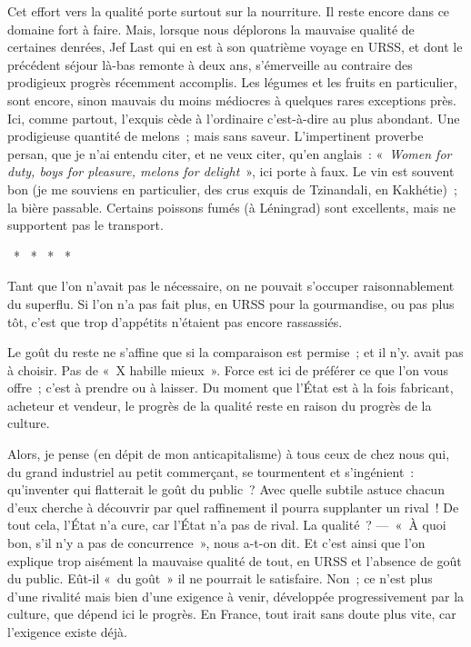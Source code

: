 \documentclass[french,twoside]{book} %
\begin{document}
Cet effort vers la qualité porte surtout sur la nourriture. Il reste encore dans ce domaine fort à faire. Mais, lorsque nous déplorons la mauvaise qualité de certaines denrées, Jef Last qui en est à son quatrième voyage en URSS, et dont le précédent séjour là-bas remonte à deux ans, s’émerveille au contraire des prodigieux progrès récemment accomplis. Les légumes et les fruits en particulier, sont encore, sinon mauvais du moins médiocres à quelques rares exceptions près. Ici, comme partout, l’exquis cède à l’ordinaire c’est-à-dire au plus abondant. Une prodigieuse quantité de melons ; mais sans saveur. L’impertinent proverbe persan, que je n’ai entendu citer, et ne veux citer, qu’en anglais : « \emph{Women for duty, boys for pleasure, melons for delight} », ici porte à faux. Le vin est souvent bon (je me souviens en particulier, des crus exquis de Tzinandali, en Kakhétie) ; la bière passable. Certains poissons fumés (à Léningrad) sont excellents, mais ne supportent pas le transport.\par
{\centering \noindent *  *  *  *  *\par}
\noindent Tant que l’on n’avait pas le nécessaire, on ne pouvait s’occuper raisonnablement du superflu. Si l’on n’a pas fait plus, en URSS pour la gourmandise, ou pas plus tôt, c’est que trop d’appétits n’étaient pas encore rassassiés.\par
Le goût du reste ne s’affine que si la comparaison est permise ; et il n’y. avait pas à choisir. Pas de « X habille mieux ». Force est ici de préférer ce que l’on vous offre ; c’est à prendre ou à laisser. Du moment que l’État est à la fois fabricant, acheteur et vendeur, le progrès de la qualité reste en raison du progrès de la culture.\par
Alors, je pense (en dépit de mon anticapitalisme) à tous ceux de chez nous qui, du grand industriel au petit commerçant, se tourmentent et s’ingénient : qu’inventer qui flatterait le goût du public ? Avec quelle subtile astuce chacun d’eux cherche à découvrir par quel raffinement il pourra supplanter un rival ! De tout cela, l’État n’a cure, car l’État n’a pas de rival. La qualité ? — « À quoi bon, s’il n’y a pas de concurrence », nous a-t-on dit. Et c’est ainsi que l’on explique trop aisément la mauvaise qualité de tout, en URSS et l’absence de goût du public. Eût-il « du goût » il ne pourrait le satisfaire. Non ; ce n’est plus d’une rivalité mais bien d’une exigence à venir, développée progressivement par la culture, que dépend ici le progrès. En France, tout irait sans doute plus vite, car l’exigence existe déjà.\par
\end{document}
